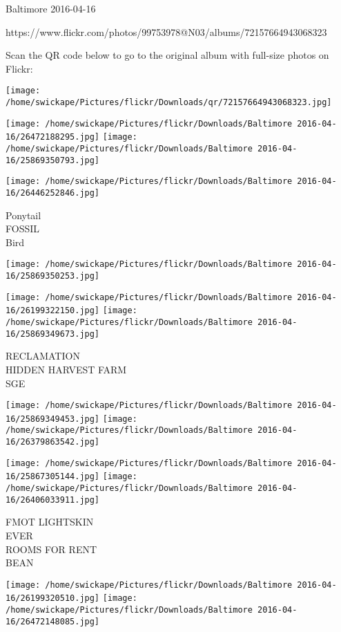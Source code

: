 \documentclass[10pt,letterpaper]{article}
\begin{document}
Baltimore 2016-04-16

https://www.flickr.com/photos/99753978@N03/albums/72157664943068323

Scan the QR code below to go to the original album with full-size photos on Flickr:

\texttt{[image: /home/swickape/Pictures/flickr/Downloads/qr/72157664943068323.jpg]}
\pagebreak

\texttt{[image: /home/swickape/Pictures/flickr/Downloads/Baltimore 2016-04-16/26472188295.jpg]}
\texttt{[image: /home/swickape/Pictures/flickr/Downloads/Baltimore 2016-04-16/25869350793.jpg]}

\texttt{[image: /home/swickape/Pictures/flickr/Downloads/Baltimore 2016-04-16/26446252846.jpg]}

Ponytail\\
FOSSIL\\
Bird
\pagebreak

\texttt{[image: /home/swickape/Pictures/flickr/Downloads/Baltimore 2016-04-16/25869350253.jpg]}

\vspace{0.25in}
\texttt{[image: /home/swickape/Pictures/flickr/Downloads/Baltimore 2016-04-16/26199322150.jpg]}
\texttt{[image: /home/swickape/Pictures/flickr/Downloads/Baltimore 2016-04-16/25869349673.jpg]}

RECLAMATION\\
HIDDEN HARVEST FARM\\
SGE
\pagebreak

\texttt{[image: /home/swickape/Pictures/flickr/Downloads/Baltimore 2016-04-16/25869349453.jpg]}
\texttt{[image: /home/swickape/Pictures/flickr/Downloads/Baltimore 2016-04-16/26379863542.jpg]}

\texttt{[image: /home/swickape/Pictures/flickr/Downloads/Baltimore 2016-04-16/25867305144.jpg]}
\texttt{[image: /home/swickape/Pictures/flickr/Downloads/Baltimore 2016-04-16/26406033911.jpg]}

FMOT LIGHTSKIN\\
EVER\\
ROOMS FOR RENT\\
BEAN
\pagebreak

\texttt{[image: /home/swickape/Pictures/flickr/Downloads/Baltimore 2016-04-16/26199320510.jpg]}
\texttt{[image: /home/swickape/Pictures/flickr/Downloads/Baltimore 2016-04-16/26472148085.jpg]}
\end{document}
